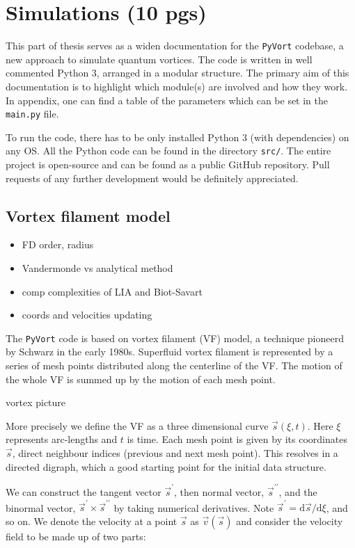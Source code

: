 \chapter{Simulations (10 pgs)}

This part of thesis serves as a widen documentation for the \texttt{PyVort} codebase, a new approach to simulate quantum vortices. The code is written in well commented Python 3, arranged in a modular structure. The primary aim of this documentation is to highlight which module(s) are involved and how they work.
In appendix, one can find a table of the parameters which can be set in the \texttt{main.py} file.

To run the code, there has to be only installed Python 3 (with dependencies) on any OS. All the Python code can be found in the directory \texttt{src/}. The entire project is open-source and can be found as a public GitHub repository. Pull requests of any further development would be definitely appreciated.

\section{Vortex filament model}
\begin{itemize}
	\item FD order, radius
	\item Vandermonde vs analytical method
	\item comp complexities of LIA and Biot-Savart
	\item coords and velocities updating
\end{itemize}

The \texttt{PyVort} code is based on vortex filament (VF) model, a technique pioneerd by Schwarz in the early 1980s. Superfluid vortex filament is represented by a series of mesh points distributed along the centerline of the VF. The motion of the whole VF is summed up by the motion of each mesh point.

\todo vortex picture

More precisely we define the VF as a three dimensional curve
$\vec{s}(\xi, t)$. Here $\xi$ represents arc-lengths and $t$ is time. Each mesh point is given by its coordinates $\vec{s}$, direct neighbour indices (previous and next mesh point). This resolves in a directed digraph, which a good starting point for the initial data structure.

We can construct the tangent vector $\vec{s}^{\prime}$, then normal vector, $\vec{s}^{\prime\prime}$, and the binormal vector, $\vec{s}^{\prime} \times \vec{s}^{\prime\prime}$ by taking numerical derivatives. Note $\vec{s}^{\prime} = \text{d}\vec{s} / \text{d}\xi$,
and so on. We denote the velocity at a point $\vec{s}$ as $\vec{v}(\vec{s})$ and consider the velocity field to be made up of two parts:

